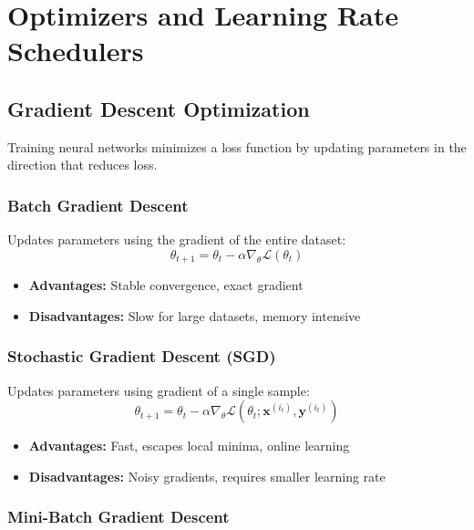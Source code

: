 ﻿\clearpage
\cleardoublepage

\chapter{Optimizers and Learning Rate Schedulers}

\section{Gradient Descent Optimization}

Training neural networks minimizes a loss function by updating parameters in the direction that reduces loss.

\subsection{Batch Gradient Descent}

Updates parameters using the gradient of the entire dataset:
\begin{equation}
\theta_{t+1} = \theta_t - \alpha \nabla_\theta \mathcal{L}(\theta_t)
\end{equation}

\begin{itemize}
    \item \textbf{Advantages:} Stable convergence, exact gradient
    \item \textbf{Disadvantages:} Slow for large datasets, memory intensive
\end{itemize}

\subsection{Stochastic Gradient Descent (SGD)}

Updates parameters using gradient of a single sample:
\begin{equation}
\theta_{t+1} = \theta_t - \alpha \nabla_\theta \mathcal{L}(\theta_t; \mathbf{x}^{(i_t)}, \mathbf{y}^{(i_t)})
\end{equation}

\begin{itemize}
    \item \textbf{Advantages:} Fast, escapes local minima, online learning
    \item \textbf{Disadvantages:} Noisy gradients, requires smaller learning rate
\end{itemize}

\subsection{Mini-Batch Gradient Descent}

